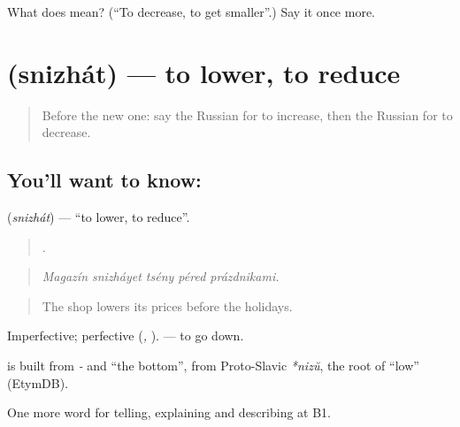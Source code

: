 \begin{tcolorbox}[breakable,colback=teal!4,colframe=teal!35!black,title={Before you move on}]
What does  mean? (\textquotedblleft{}To decrease, to get smaller\textquotedblright{}.) Say it once more.
\end{tcolorbox}
\section[\texorpdfstring{\ru{снижать} (snizhát)}{снижать (snizhát)}]{ (snizhát) — to lower, to reduce}

\label{lesson:RU-C354-snizhat}



\begin{quote}
Before the new one: say the Russian for to increase, then the Russian for to decrease.
\end{quote}

\subsection*{You'll want to know: }
\textbf{} (\emph{snizhát}) — \textquotedblleft{}to lower, to reduce\textquotedblright{}.

\begin{quote}
    .
\end{quote}

\begin{quote}
\emph{Magazín snizháyet tsény péred prázdnikami.}
\end{quote}

\begin{quote}
The shop lowers its prices before the holidays.
\end{quote}

Imperfective; perfective \emph{} (\emph{, }). \emph{} — to go down.

\begin{cousinweb}
\textbf{} is built from \emph{-} and \emph{} \textquotedblleft{}the bottom\textquotedblright{}, from Proto-Slavic \emph{*nizŭ}, the root of \emph{} \textquotedblleft{}low\textquotedblright{} (EtymDB).
\end{cousinweb}

\begin{grammarlens}[title={What you've built}]
One more word for telling, explaining and describing at B1.
\end{grammarlens}

